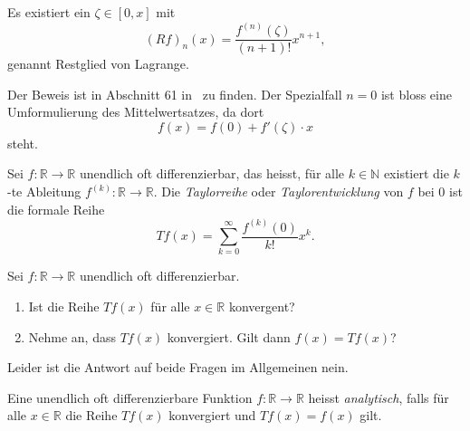 \documentclass[../main.tex]{subfiles}
\begin{document}
\begin{zusatz}
  Es existiert ein $\zeta \in [0, x]$ mit 
  \[
    {(Rf)}_n(x) = \frac{f^{(n)}(\zeta)}{(n+1)!}x^{n+1},
  \]
  genannt Restglied von Lagrange.
\end{zusatz}

Der Beweis ist in Abschnitt 61 in~\cite{heuser} zu finden.
Der Spezialfall $n = 0$ ist bloss eine Umformulierung des Mittelwertsatzes,
da dort
\[
  f(x) = f(0) + f'(\zeta) \cdot x
\]
steht.

\begin{definition}
  Sei $f \colon \mathbb{R} \to \mathbb{R}$ unendlich oft differenzierbar,
  das heisst, für alle $k \in \mathbb{N}$ existiert die $k$-te Ableitung
  $f^{(k)} \colon \mathbb{R} \to \mathbb{R}$.
  Die \emph{Taylorreihe} oder \emph{Taylorentwicklung} von $f$ bei $0$ ist die formale Reihe
  \[
    Tf(x) = \sum_{k=0}^{\infty} \frac{f^{(k)}(0)}{k!}x^k.
  \]
\end{definition}

\begin{questions}
  Sei $f \colon \mathbb{R} \to \mathbb{R}$ unendlich oft
  differenzierbar.
  \begin{enumerate}[(1)]
    \item Ist die Reihe $Tf(x)$ für alle $x \in \mathbb{R}$ konvergent?
    \item Nehme an, dass $Tf(x)$ konvergiert. Gilt dann $f(x) = Tf(x)$?
  \end{enumerate}
\end{questions}

Leider ist die Antwort auf beide Fragen im Allgemeinen nein.

\begin{definition}
  Eine unendlich oft differenzierbare Funktion
  $f \colon \mathbb{R} \to \mathbb{R}$ heisst \emph{analytisch},
  falls für alle $x \in \mathbb{R}$ die Reihe
  $Tf(x)$ konvergiert und $Tf(x) = f(x)$ gilt.
\end{definition}
\end{document}
